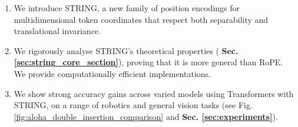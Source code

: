 \begin{enumerate}[leftmargin=*, itemsep=-1pt, topsep=0pt]
\item We introduce STRING, a new family of position encodings for multidimensional token coordinates that respect both separability and translational invariance. 
\item We rigorously analyse STRING's theoretical properties (\textbf{ Sec. \ref{sec:string_core_section}}), proving that it is more general than RoPE.
We provide computationally efficient implementations.
\item We show strong accuracy gains across varied models using Transformers with STRING, on a range of robotics and general vision tasks (see Fig. \ref{fig:aloha_double_insertion_comparison} and \textbf{Sec.  \textbf{\ref{sec:experiments}}}).
\end{enumerate}

